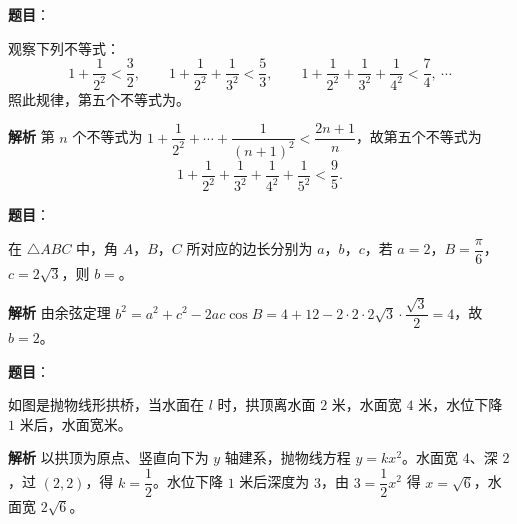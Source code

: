 \begin{answer}

\textbf{题目}：

观察下列不等式：
\nopagebreak[4]
\[1+\frac1{2^2}<\frac32,\qquad1+\frac1{2^2}+\frac1{3^2}<\frac53,\qquad1+\frac1{2^2}+\frac1{3^2}+\frac1{4^2}<\frac74,\ \cdots\]
照此规律，第五个不等式为\gkblank{}。

\textbf{解析}
第 $n$ 个不等式为 $1+\dfrac1{2^2}+\cdots+\dfrac1{(n+1)^2}<\dfrac{2n+1}{n}$，故第五个不等式为
\nopagebreak[4]
\[1+\frac1{2^2}+\frac1{3^2}+\frac1{4^2}+\frac1{5^2}<\frac95.\]


\end{answer}
\begin{answer}

\textbf{题目}：

在 $\triangle ABC$ 中，角 $A$，$B$，$C$ 所对应的边长分别为 $a$，$b$，$c$，若 $a=2$，$B=\dfrac\pi6$，$c=2\sqrt3$，则 $b=$\gkblank{}。

\textbf{解析}
由余弦定理 $b^2=a^2+c^2-2ac\cos B=4+12-2\cdot2\cdot2\sqrt3\cdot\dfrac{\sqrt3}2=4$，故 $b=2$。


\end{answer}
\begin{answer}

\textbf{题目}：

如图是抛物线形拱桥，当水面在 $l$ 时，拱顶离水面 $2$ 米，水面宽 $4$ 米，水位下降 $1$ 米后，水面宽\gkblank{}米。
\nopagebreak[4]
\begin{center}\end{center}
\nopagebreak[4]
\textbf{解析}
以拱顶为原点、竖直向下为 $y$ 轴建系，抛物线方程 $y=kx^2$。水面宽 $4$、深 $2$，过 $(2,2)$，得 $k=\dfrac12$。水位下降 $1$ 米后深度为 $3$，由 $3=\dfrac12x^2$ 得 $x=\sqrt6$，水面宽 $2\sqrt6$。


\end{answer}
